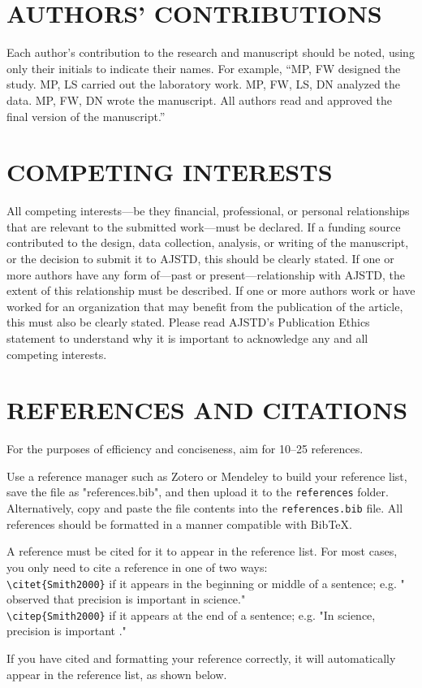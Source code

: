 \documentclass[twocolumn,twoside]{base/ajstd}
\begin{document}
\section*{AUTHORS’ CONTRIBUTIONS}

Each author’s contribution to the research and manuscript should be noted, using only their initials to indicate their names. For example, “MP, FW designed the study. MP, LS carried out the laboratory work. MP, FW, LS, DN analyzed the data. MP, FW, DN wrote the manuscript. All authors read and approved the final version of the manuscript.”

\section*{COMPETING INTERESTS}

All competing interests—be they financial, professional, or personal relationships that are relevant to the submitted work—must be declared. If a funding source contributed to the design, data collection, analysis, or writing of the manuscript, or the decision to submit it to AJSTD, this should be clearly stated. If one or more authors have any form of—past or present—relationship with AJSTD, the extent of this relationship must be described. If one or more authors work or have worked for an organization that may benefit from the publication of the article, this must also be clearly stated. Please read AJSTD’s Publication Ethics statement to understand why it is important to acknowledge any and all competing interests.

\section*{REFERENCES AND CITATIONS}

For the purposes of efficiency and conciseness, aim for 10--25 references.

Use a reference manager such as Zotero or Mendeley to build your reference list, save the file as "references.bib", and then upload it to the \verb|references| folder. Alternatively, copy and paste the file contents into the \verb|references.bib| file. All references should be formatted in a manner compatible with BibTeX. 

A reference must be cited for it to appear in the reference list. For most cases, you only need to cite a reference in one of two ways: \\

\noindent \verb|\citet{Smith2000}| if it appears in the beginning or middle of a sentence; e.g. "\citet{Smith2000} observed that precision is important in science." \\

\noindent \verb|\citep{Smith2000}| if it appears at the end of a sentence; e.g. "In science, precision is important \citep{Smith2000}."

If you have cited and formatting your reference correctly, it will automatically appear in the reference list, as shown below.



\atColsEnd{\vfill}
\end{document}
